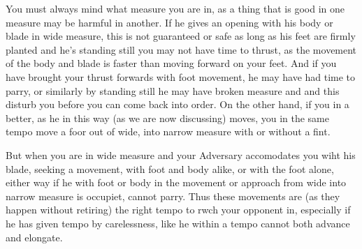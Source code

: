 \newpage


\newpage


You must always mind what measure you are in, as a thing that is good
in one measure may be harmful in another. If he gives an opening with
his body or blade in wide measure, this is not guaranteed or safe as
long as his feet are firmly planted and he's standing still you may
not have time to thrust, as the movement of the body and blade is
faster than moving forward on your feet. And if you have brought your
thrust forwards with foot movement, he may have had time to parry, or
similarly by standing still he may have broken measure and and this
disturb you before you can come back into order. On the other hand, if
you in a better, as he in this way (as we are now discussing) moves,
you in the same tempo move a foor out of wide, into narrow measure
with or without a fint.


But when you are in wide measure and your Adversary accomodates you
wiht his blade, seeking a movement, with foot and body alike, or with
the foot alone, either way if he with foot or body in the movement or
approach from wide into narrow measure is occupiet, cannot parry. Thus
these movements are (as they happen without retiring) the right tempo
to rwch your opponent in, especially if he has given tempo by
carelessness, like he within a tempo cannot both advance and elongate.


